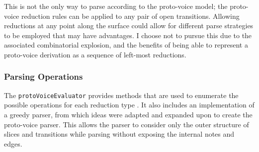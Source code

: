 \documentclass[12pt,a4paper,twoside,openany]{report} \usepackage[pdfborder={0 0 0}]{hyperref}    %
\theoremstyle{definition} \newtheorem{definition}{Definition}[section]
\begin{document}



      This is not the only way to parse according to the proto-voice model; the proto-voice reduction rules can be applied
      to any pair of open transitions. Allowing reductions at any point along the surface could allow for different
      parse strategies to be employed that may have advantages. I choose not to pursue this due to the associated
      combinatorial explosion, and the benefits of being able to represent a proto-voice derivation as a sequence of
      left-most reductions.

      \subsubsection{Parsing Operations} The \texttt{protoVoiceEvaluator}
      \cite{finkensiepModelingInferringProtovoice2021} provides methods that are used to enumerate the possible
      operations for each reduction type \footnotemark. It also includes an implementation of a greedy parser, from
      which ideas were adapted and expanded upon to create the proto-voice parser. This allows the parser to consider
      only the outer structure of slices and transitions while parsing without exposing the internal notes and edges.
\end{document}
